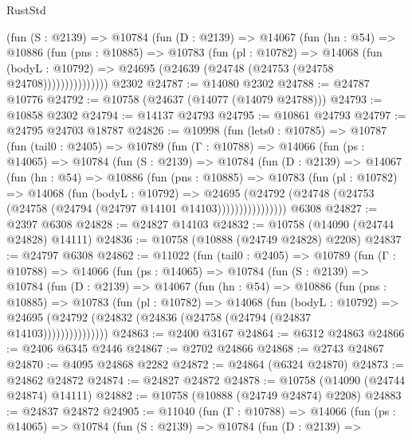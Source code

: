 \begin{lexlean}{RustStd}
\begin{coremodule}
              (fun (S : @2139) =>
              @10784
                (fun (D : @2139) =>
                @14067
                  (fun (hn : @54) =>
                  @10886
                    (fun (pns : @10885) =>
                    @10783
                      (fun (pl : @10782) =>
                      @14068
                        (fun (bodyL : @10792) =>
                        @24695 (@24639 (@24748 (@24753 (@24758 @24708)))))))))))))))
    @2302
@24787 := @14080 @2302
@24788 := @24787 @10776
@24792 := @10758 (@24637 (@14077 (@14079 @24788)))
@24793 := @10858 @2302
@24794 := @14137 @24793
@24795 := @10861 @24793
@24797 := @24795 @24703 @18787
@24826 := @10998
    (fun (lets0 : @10785) =>
    @10787
      (fun (tail0 : @2405) =>
      @10789
        (fun (Γ : @10788) =>
        @14066
          (fun (ps : @14065) =>
          @10784
            (fun (S : @2139) =>
            @10784
              (fun (D : @2139) =>
              @14067
                (fun (hn : @54) =>
                @10886
                  (fun (pns : @10885) =>
                  @10783
                    (fun (pl : @10782) =>
                    @14068
                      (fun (bodyL : @10792) =>
                      @24695
                        (@24792
                          (@24748 (@24753 (@24758 (@24794 (@24797 @14101 @14103))))))))))))))))
    @6308
@24827 := @2397 @6308
@24828 := @24827 @14103
@24832 := @10758 (@14090 (@24744 @24828) @14111)
@24836 := @10758 (@10888 (@24749 @24828) @2208)
@24837 := @24797 @6308
@24862 := @11022
    (fun (tail0 : @2405) =>
    @10789
      (fun (Γ : @10788) =>
      @14066
        (fun (ps : @14065) =>
        @10784
          (fun (S : @2139) =>
          @10784
            (fun (D : @2139) =>
            @14067
              (fun (hn : @54) =>
              @10886
                (fun (pns : @10885) =>
                @10783
                  (fun (pl : @10782) =>
                  @14068
                    (fun (bodyL : @10792) =>
                    @24695 (@24792 (@24832 (@24836 (@24758 (@24794 (@24837 @14103)))))))))))))))
@24863 := @2400 @3167
@24864 := @6312 @24863
@24866 := @2406 @6345 @2446
@24867 := @2702 @24866
@24868 := @2743 @24867
@24870 := @4095 @24868 @2282
@24872 := @24864 (@6324 @24870)
@24873 := @24862 @24872
@24874 := @24827 @24872
@24878 := @10758 (@14090 (@24744 @24874) @14111)
@24882 := @10758 (@10888 (@24749 @24874) @2208)
@24883 := @24837 @24872
@24905 := @11040
    (fun (Γ : @10788) =>
    @14066
      (fun (ps : @14065) =>
      @10784
        (fun (S : @2139) =>
        @10784
          (fun (D : @2139) =>

\end{coremodule}
\end{lexlean}
